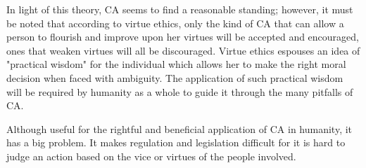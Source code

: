 In light of this theory, CA seems to find a reasonable standing; however, it must be noted that according to virtue ethics, only the kind of CA that can allow a person to flourish and improve upon her virtues will be accepted and encouraged, ones that weaken virtues will all be discouraged. Virtue ethics espouses an idea of "practical wisdom" for the individual which allows her to make the right moral decision when faced with ambiguity. The application of such practical wisdom will be required by humanity as a whole to guide it through the many pitfalls of CA.

Although useful for the rightful and beneficial application of CA in humanity, it has a big problem. It makes regulation and legislation difficult for it is hard to judge an action based on the vice or virtues of the people involved.